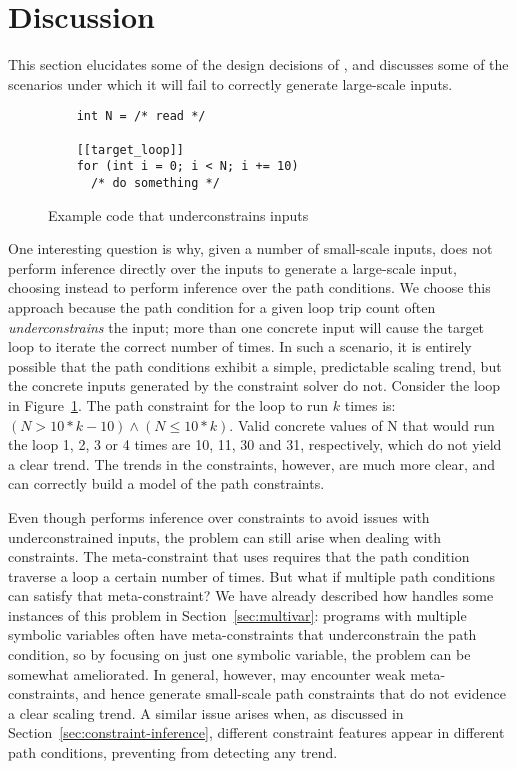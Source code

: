 \section{Discussion}\label{sec:discussion}

This section elucidates some of the design decisions of \lancet, and discusses some of the scenarios under which it will fail to correctly generate large-scale inputs.

\begin{figure}
  \centering
  \begin{lstlisting}
    int N = /* read */
    
    [[target_loop]]
    for (int i = 0; i < N; i += 10)
      /* do something */
  \end{lstlisting}
  \vspace{-5pt}
  \caption{Example code that underconstrains inputs}
  \label{fig:underconstrained}
\end{figure}

One interesting question is why, given a number of small-scale inputs, \lancet does not perform inference directly over the inputs to generate a large-scale input, choosing instead to perform inference over the path conditions. We choose this approach because the path condition for a given loop trip count often {\em underconstrains} the input; more than one concrete input will cause the target loop to iterate the correct number of times. In such a scenario, it is entirely possible that the path conditions exhibit a simple, predictable scaling trend, but the concrete inputs generated by the constraint solver do not. Consider the loop in Figure~\ref{fig:underconstrained}. The path constraint for the loop to run $k$ times is: $(N > 10*k - 10) \land (N \le 10*k)$. Valid concrete values of N that would run the loop 1, 2, 3 or 4 times are 10, 11, 30 and 31, respectively, which do not yield a clear trend. The trends in the constraints, however, are much more clear, and \lancet can correctly build a model of the path constraints.

Even though \lancet performs inference over constraints to avoid issues with underconstrained inputs, the problem can still arise when dealing with constraints. The meta-constraint that \lancet uses requires that the path condition traverse a loop a certain number of times. But what if multiple path conditions can satisfy that meta-constraint? We have already described how \lancet handles some instances of this problem in Section~\ref{sec:multivar}: programs with multiple symbolic variables often have meta-constraints that underconstrain the path condition, so by focusing on just one symbolic variable, the problem can be somewhat ameliorated. In general, however, \lancet may encounter weak meta-constraints, and hence generate small-scale path constraints that do not evidence a clear scaling trend. A similar issue arises when, as discussed in Section~\ref{sec:constraint-inference}, different constraint features appear in different path conditions, preventing \lancet from detecting any trend.

